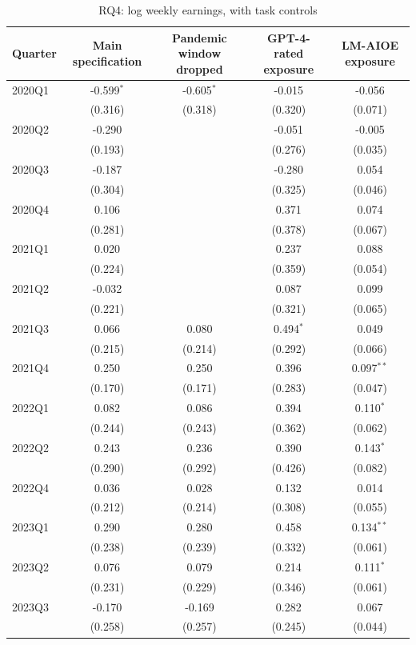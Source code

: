 \begin{table}[htbp]\centering
\caption{RQ4: log weekly earnings, with task controls}
\begin{tabular}{lcccc}
\toprule
Quarter & Main specification & Pandemic window dropped & GPT-4-rated exposure & LM-AIOE exposure \\
\midrule
2020Q1 & -0.599$^{*}$ & -0.605$^{*}$ & -0.015 & -0.056 \\
 & (0.316) & (0.318) & (0.320) & (0.071) \\
2020Q2 & -0.290 &  & -0.051 & -0.005 \\
 & (0.193) &  & (0.276) & (0.035) \\
2020Q3 & -0.187 &  & -0.280 & 0.054 \\
 & (0.304) &  & (0.325) & (0.046) \\
2020Q4 & 0.106 &  & 0.371 & 0.074 \\
 & (0.281) &  & (0.378) & (0.067) \\
2021Q1 & 0.020 &  & 0.237 & 0.088 \\
 & (0.224) &  & (0.359) & (0.054) \\
2021Q2 & -0.032 &  & 0.087 & 0.099 \\
 & (0.221) &  & (0.321) & (0.065) \\
2021Q3 & 0.066 & 0.080 & 0.494$^{*}$ & 0.049 \\
 & (0.215) & (0.214) & (0.292) & (0.066) \\
2021Q4 & 0.250 & 0.250 & 0.396 & 0.097$^{**}$ \\
 & (0.170) & (0.171) & (0.283) & (0.047) \\
2022Q1 & 0.082 & 0.086 & 0.394 & 0.110$^{*}$ \\
 & (0.244) & (0.243) & (0.362) & (0.062) \\
2022Q2 & 0.243 & 0.236 & 0.390 & 0.143$^{*}$ \\
 & (0.290) & (0.292) & (0.426) & (0.082) \\
2022Q4 & 0.036 & 0.028 & 0.132 & 0.014 \\
 & (0.212) & (0.214) & (0.308) & (0.055) \\
2023Q1 & 0.290 & 0.280 & 0.458 & 0.134$^{**}$ \\
 & (0.238) & (0.239) & (0.332) & (0.061) \\
2023Q2 & 0.076 & 0.079 & 0.214 & 0.111$^{*}$ \\
 & (0.231) & (0.229) & (0.346) & (0.061) \\
2023Q3 & -0.170 & -0.169 & 0.282 & 0.067 \\
 & (0.258) & (0.257) & (0.245) & (0.044) \\

\end{tabular}
\end{table}
